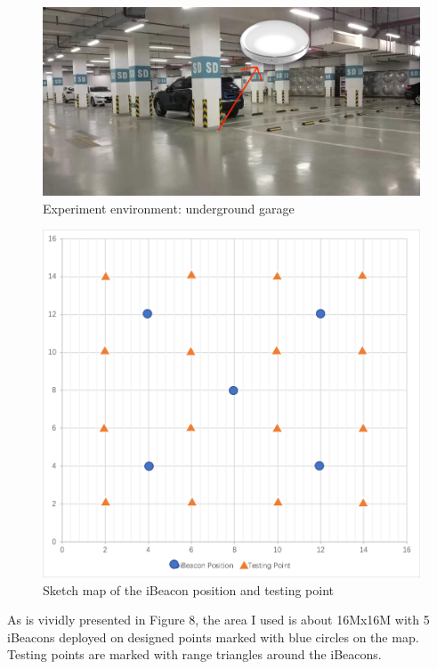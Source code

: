 \documentclass{sigchi}
\begin{document}
\begin{figure}[!h]
\centering
\includegraphics[width=1\columnwidth]{4.png}
\caption{Experiment environment: underground garage}
\label{fig:universe}
\end{figure}

\begin{figure}[!h]
\centering
\includegraphics[width=1\columnwidth]{5.png}
\caption{Sketch map of the iBeacon position and testing point}
\label{fig:universe}
\end{figure}

As is vividly presented in Figure 8, the area I used is about 16Mx16M with 5 iBeacons deployed on designed points marked with blue circles on the map. Testing points are marked with range triangles around the iBeacons. 
\end{document}

